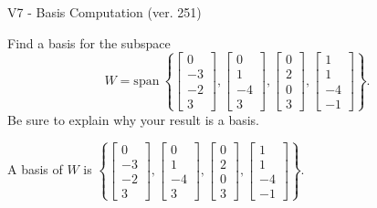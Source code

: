 \begin{exercise}
  \begin{exerciseTitle}V7 - Basis Computation (ver. 251)\end{exerciseTitle}
  \begin{exerciseStatement}
    Find a basis for the subspace 
\[W=\mathrm{span}\ \left\{\left[\begin{array}{r}
0 \\
-3 \\
-2 \\
3
\end{array}\right] , \left[\begin{array}{r}
0 \\
1 \\
-4 \\
3
\end{array}\right] , \left[\begin{array}{r}
0 \\
2 \\
0 \\
3
\end{array}\right] , \left[\begin{array}{r}
1 \\
1 \\
-4 \\
-1
\end{array}\right]\right\}.\]
 Be sure to explain why your result is a basis.


  \end{exerciseStatement}
  \begin{exerciseAnswer}
   A basis of \(W\) is  \(\left\{\left[\begin{array}{r}
0 \\
-3 \\
-2 \\
3
\end{array}\right] , \left[\begin{array}{r}
0 \\
1 \\
-4 \\
3
\end{array}\right] , \left[\begin{array}{r}
0 \\
2 \\
0 \\
3
\end{array}\right] , \left[\begin{array}{r}
1 \\
1 \\
-4 \\
-1
\end{array}\right]\right\}\).
  


  \end{exerciseAnswer}
\end{exercise}
